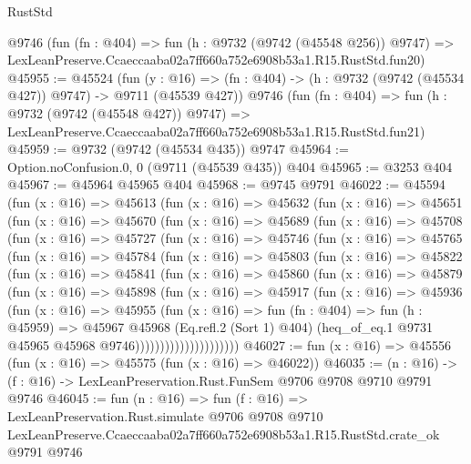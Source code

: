 \begin{lexlean}{RustStd}
\begin{coremodule}
    @9746
    (fun (fn : @404) =>
    fun (h : @9732 (@9742 (@45548 @256)) @9747) =>
    LexLeanPreserve.Ccaeccaaba02a7ff660a752e6908b53a1.R15.RustStd.fun20)
@45955 := @45524
    (fun (y : @16) => (fn : @404) -> (h : @9732 (@9742 (@45534 @427)) @9747) -> @9711 (@45539 @427))
    @9746
    (fun (fn : @404) =>
    fun (h : @9732 (@9742 (@45548 @427)) @9747) =>
    LexLeanPreserve.Ccaeccaaba02a7ff660a752e6908b53a1.R15.RustStd.fun21)
@45959 := @9732 (@9742 (@45534 @435)) @9747
@45964 := Option.noConfusion.{0, 0} (@9711 (@45539 @435)) @404
@45965 := @3253 @404
@45967 := @45964 @45965 @404
@45968 := @9745 @9791
@46022 := @45594
    (fun (x : @16) =>
    @45613
      (fun (x : @16) =>
      @45632
        (fun (x : @16) =>
        @45651
          (fun (x : @16) =>
          @45670
            (fun (x : @16) =>
            @45689
              (fun (x : @16) =>
              @45708
                (fun (x : @16) =>
                @45727
                  (fun (x : @16) =>
                  @45746
                    (fun (x : @16) =>
                    @45765
                      (fun (x : @16) =>
                      @45784
                        (fun (x : @16) =>
                        @45803
                          (fun (x : @16) =>
                          @45822
                            (fun (x : @16) =>
                            @45841
                              (fun (x : @16) =>
                              @45860
                                (fun (x : @16) =>
                                @45879
                                  (fun (x : @16) =>
                                  @45898
                                    (fun (x : @16) =>
                                    @45917
                                      (fun (x : @16) =>
                                      @45936
                                        (fun (x : @16) =>
                                        @45955
                                          (fun (x : @16) =>
                                          fun (fn : @404) =>
                                          fun (h : @45959) =>
                                          @45967
                                            @45968
                                            (Eq.refl.{2} (Sort 1) @404)
                                            (heq_of_eq.{1}
                                              @9731
                                              @45965
                                              @45968
                                              @9746)))))))))))))))))))))
@46027 := fun (x : @16) => @45556 (fun (x : @16) => @45575 (fun (x : @16) => @46022))
@46035 := (n : @16) -> (f : @16) -> LexLeanPreservation.Rust.FunSem @9706 @9708 @9710 @9791 @9746
@46045 := fun (n : @16) =>
  fun (f : @16) =>
  LexLeanPreservation.Rust.simulate
    @9706
    @9708
    @9710
    LexLeanPreserve.Ccaeccaaba02a7ff660a752e6908b53a1.R15.RustStd.crate_ok
    @9791
    @9746
\end{coremodule}
\end{lexlean}
